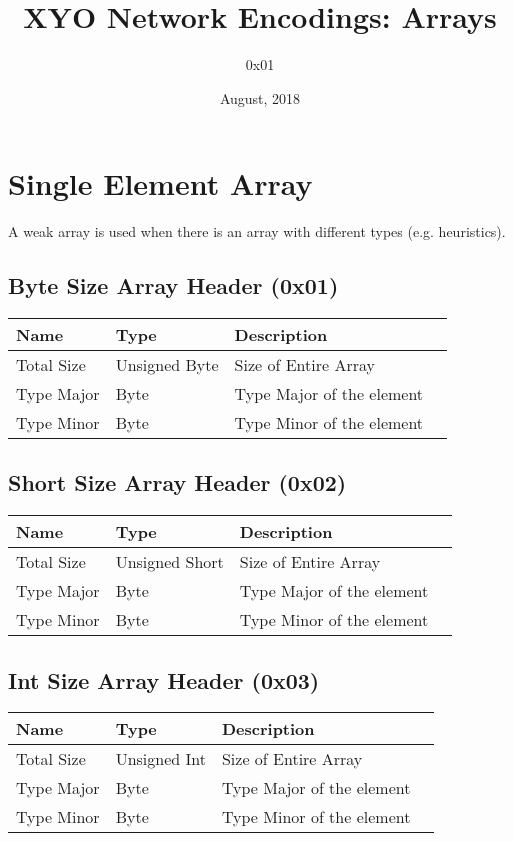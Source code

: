 \documentclass[11pt]{article}
\title{XYO Network Encodings: Arrays}
\author{0x01}
\date{August, 2018}
\begin{document}
\maketitle

\section{Single Element Array}
A weak array is used when there is an array with different types (e.g. heuristics).
\subsection{Byte Size Array Header (0x01)}

\begin{center}
\begin{tabular}{ |l|l|l|l| } 
\hline
\textbf{Name} & \textbf{Type} & \textbf{Description}\\
\hline
Total Size & Unsigned Byte & Size of Entire Array\\  
Type Major & Byte & Type Major of the element\\  
Type Minor & Byte & Type Minor of the element\\
\hline
\end{tabular}
\end{center}

\subsection{Short Size Array Header (0x02)}

\begin{center}
\begin{tabular}{ |l|l|l|l| } 
\hline
\textbf{Name} & \textbf{Type} & \textbf{Description}\\
\hline
Total Size & Unsigned Short & Size of Entire Array\\  
Type Major & Byte & Type Major of the element\\  
Type Minor & Byte & Type Minor of the element\\
\hline
\end{tabular}
\end{center}

\subsection{Int Size Array Header (0x03)}

\begin{center}
\begin{tabular}{ |l|l|l|l| } 
\hline
\textbf{Name} & \textbf{Type} & \textbf{Description}\\
\hline
Total Size & Unsigned Int & Size of Entire Array\\  
Type Major & Byte & Type Major of the element\\  
Type Minor & Byte & Type Minor of the element\\
\hline
\end{tabular}
\end{center}
\end{document}
